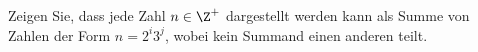 
\begin{exercise}

Zeigen Sie, dass jede Zahl $n \in \Z^+$ dargestellt werden kann als
Summe von Zahlen der Form $n = 2^i3^j$, wobei kein Summand einen anderen teilt.

\end{exercise}


\begin{solution}

\phantom{}

\end{solution}

